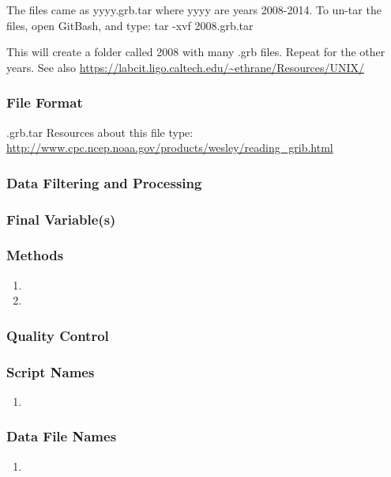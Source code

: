 The files came as yyyy.grb.tar where yyyy are years 2008-2014. To un-tar the files, open GitBash, and type: tar -xvf 2008.grb.tar

This will create a folder called 2008 with many .grb files. Repeat for the other years. See also \url{https://labcit.ligo.caltech.edu/~ethrane/Resources/UNIX/}

\subsubsection*{File Format}
.grb.tar
Resources about this file type: \url{http://www.cpc.ncep.noaa.gov/products/wesley/reading_grib.html}
\subsubsection*{Data Filtering and Processing}
\subsubsection*{Final Variable(s)}
\subsubsection*{Methods}
\begin{enumerate}
\item 
\item
\end{enumerate}
\subsubsection*{Quality Control}
\subsubsection*{Script Names}
\begin{enumerate}
\item 
\end{enumerate}
\subsubsection*{Data File Names}
\begin{enumerate}
\item 
\end{enumerate} 